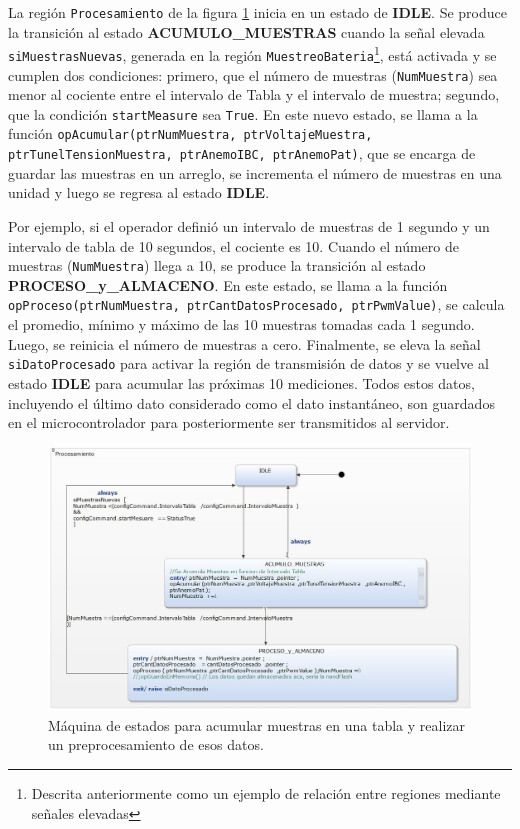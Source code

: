 La región \texttt{Procesamiento} de la figura \ref{fig:AcumularProcesarMuestras} inicia en un estado de \textbf{IDLE}. Se produce la transición al estado \textbf{ACUMULO\_MUESTRAS} cuando la señal elevada \texttt{siMuestrasNuevas}, generada en la región \texttt{MuestreoBateria}\footnote{Descrita anteriormente como un ejemplo de relación entre regiones mediante señales elevadas}, está activada y se cumplen dos condiciones: primero, que el número de muestras (\texttt{NumMuestra}) sea menor al cociente entre el intervalo de Tabla y el intervalo de muestra; segundo, que la condición \texttt{startMeasure} sea \texttt{True}. En este nuevo estado, se llama a la función \texttt{opAcumular(ptrNumMuestra, ptrVoltajeMuestra, ptrTunelTensionMuestra, ptrAnemoIBC, ptrAnemoPat)}, que se encarga de guardar las muestras en un arreglo, se incrementa el número de muestras en una unidad y luego se regresa al estado \textbf{IDLE}.

Por ejemplo, si el operador definió un intervalo de muestras de 1 segundo y un intervalo de tabla de 10 segundos, el cociente es 10. Cuando el número de muestras (\texttt{NumMuestra}) llega a 10, se produce la transición al estado \textbf{PROCESO\_y\_ALMACENO}. En este estado, se llama a la función \texttt{opProceso(ptrNumMuestra, ptrCantDatosProcesado, ptrPwmValue)}, se calcula el promedio, mínimo y máximo de las 10 muestras tomadas cada 1 segundo. Luego, se reinicia el número de muestras a cero. Finalmente, se eleva la señal \texttt{siDatoProcesado} para activar la región de transmisión de datos y se vuelve al estado \textbf{IDLE} para acumular las próximas 10 mediciones. Todos estos datos, incluyendo el último dato considerado como el dato instantáneo, son guardados en el microcontrolador para posteriormente ser transmitidos al servidor.


\begin{figure}[H]
    \centering
    \includegraphics[width=0.9\linewidth]{Figuras/datalogger/Firmware/AcumularProcesarMuestras.jpg}
    \caption{Máquina de estados para acumular muestras en una tabla y realizar un preprocesamiento de esos datos.}
    \label{fig:AcumularProcesarMuestras}
\end{figure}

